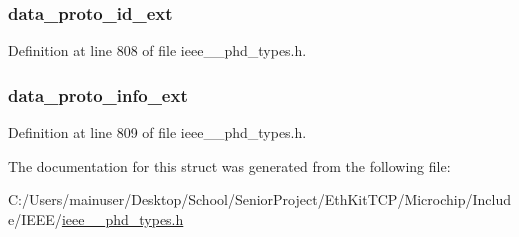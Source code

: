 \subsubsection[{data\+\_\+proto\+\_\+id\+\_\+ext}]{ data\+\_\+proto\+\_\+id\+\_\+ext}\label{struct___manuf_spec_association_information_a3d495ceace748877faecd0ecd1a20585}


Definition at line 808 of file ieee\+\_\+\_\+phd\+\_\+types.\+h.

\hypertarget{struct___manuf_spec_association_information_afb4220c386e9c19c3a73671c656a5e1f}{}
\subsubsection[{data\+\_\+proto\+\_\+info\+\_\+ext}]{ data\+\_\+proto\+\_\+info\+\_\+ext}\label{struct___manuf_spec_association_information_afb4220c386e9c19c3a73671c656a5e1f}


Definition at line 809 of file ieee\+\_\+\_\+phd\+\_\+types.\+h.



The documentation for this struct was generated from the following file\+:\begin{DoxyCompactItemize}
\item 
C\+:/\+Users/mainuser/\+Desktop/\+School/\+Senior\+Project/\+Eth\+Kit\+T\+C\+P/\+Microchip/\+Include/\+I\+E\+E\+E/\hyperlink{ieee__11073__phd__types_8h}{ieee\+\_\+\_\+phd\+\_\+types.\+h}\end{DoxyCompactItemize}
